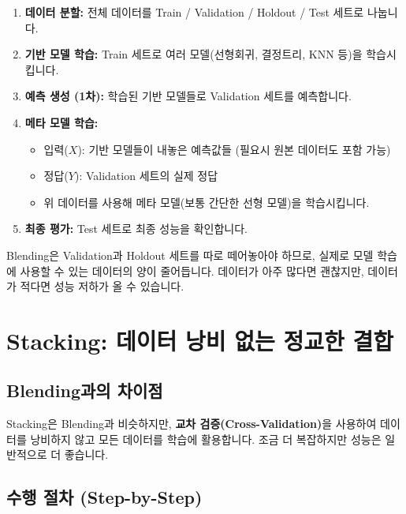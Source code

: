 \documentclass[11pt,a4paper]{book}
\theoremstyle{definition}
\begin{document}
\begin{enumerate}
    \item \textbf{데이터 분할:} 전체 데이터를 Train / Validation / Holdout / Test 세트로 나눕니다.
    \item \textbf{기반 모델 학습:} Train 세트로 여러 모델(선형회귀, 결정트리, KNN 등)을 학습시킵니다.
    \item \textbf{예측 생성 (1차):} 학습된 기반 모델들로 Validation 세트를 예측합니다.
    \item \textbf{메타 모델 학습:}
    \begin{itemize}
        \item 입력($X$): 기반 모델들이 내놓은 예측값들 (필요시 원본 데이터도 포함 가능)
        \item 정답($Y$): Validation 세트의 실제 정답
        \item 위 데이터를 사용해 메타 모델(보통 간단한 선형 모델)을 학습시킵니다.
    \end{itemize}
    \item \textbf{최종 평가:} Test 세트로 최종 성능을 확인합니다.
\end{enumerate}

\begin{warningbox}[title={Blending의 단점: 데이터 효율성}]
Blending은 Validation과 Holdout 세트를 따로 떼어놓아야 하므로, 실제로 모델 학습에 사용할 수 있는 데이터의 양이 줄어듭니다. 데이터가 아주 많다면 괜찮지만, 데이터가 적다면 성능 저하가 올 수 있습니다.
\end{warningbox}


\section{Stacking: 데이터 낭비 없는 정교한 결합}

\subsection{Blending과의 차이점}
Stacking은 Blending과 비슷하지만, \textbf{교차 검증(Cross-Validation)}을 사용하여 데이터를 낭비하지 않고 모든 데이터를 학습에 활용합니다. 조금 더 복잡하지만 성능은 일반적으로 더 좋습니다.

\subsection{수행 절차 (Step-by-Step)}
\end{document}

